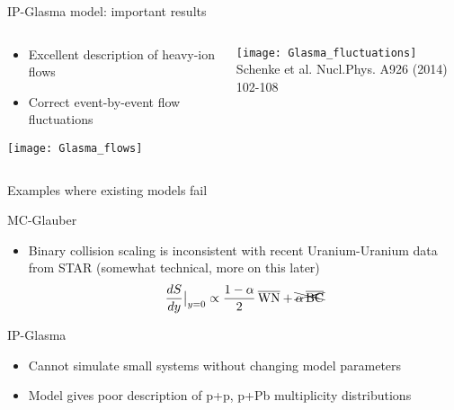 \documentclass[svgnames]{beamer}
\begin{document}
\begin{frame}{IP-Glasma model: important results}
 \begin{columns}
  \begin{column}{0.5\textwidth}
   \centering
   \begin{itemize}
    \item Excellent description of heavy-ion flows 
    \vspace{0.1 in}
    \item Correct event-by-event flow fluctuations
   \end{itemize}
   \vspace{0.2 in}
   \texttt{[image: Glasma\_flows]}
  \end{column}
  
  \begin{column}{0.5\textwidth}
   \centering
   \texttt{[image: Glasma\_fluctuations]} \\
   \tiny Schenke et al. Nucl.Phys. A926 (2014) 102-108
  \end{column}

 \end{columns}
\end{frame}

\begin{frame}{Examples where existing models fail}

 {\large MC-Glauber}
 \begin{itemize}
  \item Binary collision scaling is inconsistent with recent Uranium-Uranium data from STAR (somewhat technical, more on this later)
  \begin{equation*}
   \frac{dS}{dy} \big \vert_{y=0} \propto \frac{1-\alpha}{2}\, \overline{\text{WN}} + \xcancel{ \alpha\, \overline{\text{BC}}}
  \end{equation*}

 \end{itemize}
 
 {\large IP-Glasma}
 \begin{itemize}
   \item Cannot simulate small systems without changing model parameters
   \vspace{0.1 in}
   \item Model gives poor description of p+p, p+Pb multiplicity distributions
 \end{itemize}
\end{frame}
\end{document}
